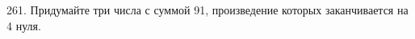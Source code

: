 261. Придумайте три числа с суммой 91, произведение которых заканчивается на 4 нуля.\newpage\noindent
